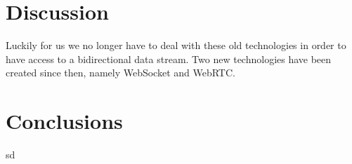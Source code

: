 \documentclass[prodmode,acmtecs]{acmsmall}
\begin{document}
\section{Discussion}
Luckily for us we no longer have to deal with these old technologies in order to have access to a bidirectional data stream. Two new technologies have been created since then, namely WebSocket and WebRTC.



\section{Conclusions}
sd
\appendix


\end{document}
